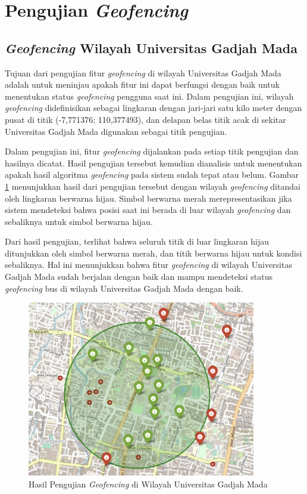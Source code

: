 \section{Pengujian \textit{Geofencing}}
\subsection{\textit{Geofencing} Wilayah Universitas Gadjah Mada}
Tujuan dari pengujian fitur \textit{geofencing} di wilayah Universitas Gadjah Mada adalah untuk meninjau apakah fitur ini dapat berfungsi dengan baik untuk menentukan status \textit{geofencing} pengguna saat ini. Dalam pengujian ini, wilayah \textit{geofencing} didefinisikan sebagai lingkaran dengan jari-jari satu kilo meter dengan pusat di titik (-7,771376; 110,377493), dan delapan belas titik acak di sekitar Universitas Gadjah Mada digunakan sebagai titik pengujian.

Dalam pengujian ini, fitur \textit{geofencing} dijalankan pada setiap titik pengujian dan hasilnya dicatat. Hasil pengujian tersebut kemudian dianalisis untuk menentukan apakah hasil algoritma \textit{geofencing} pada sistem sudah tepat atau belum. Gambar \ref{Fig: geofencing-1} menunjukkan hasil dari pengujian tersebut dengan wilayah \textit{geofencing} ditandai oleh lingkaran berwarna hijau. Simbol berwarna merah merepresentasikan jika sistem mendeteksi bahwa posisi saat ini berada di luar wilayah \textit{geofencing} dan sebaliknya untuk simbol berwarna hijau.

Dari hasil pengujian, terlihat bahwa seluruh titik di luar lingkaran hijau ditunjukkan oleh simbol berwarna merah, dan titik berwarna hijau untuk kondisi sebaliknya. Hal ini menunjukkan bahwa fitur \textit{geofencing} di wilayah Universitas Gadjah Mada sudah berjalan dengan baik dan mampu mendeteksi status \textit{geofencing} bus di wilayah Universitas Gadjah Mada dengan baik.

\begin{figure}[H]
	\centering
	\includegraphics[width=10cm]{contents/chapter-4/geofencing/wilayah-ugm.jpg}
	\caption{Hasil Pengujian \textit{Geofencing} di Wilayah Universitas Gadjah Mada}
	\label{Fig: geofencing-1}
\end{figure}

